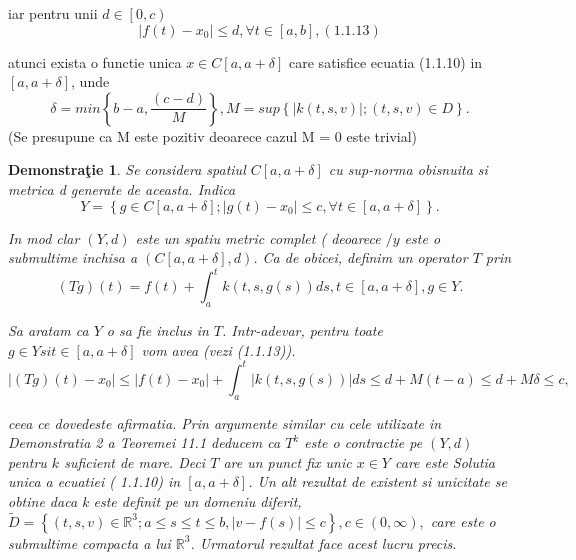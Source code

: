 \documentclass[a4paper,12pt,oneside]{report}
\newtheorem{demonstration}{Demonstra\c tie}
\begin{document}
iar pentru unii \(d \in \left [ 0,c \right )\) 
\begin{displaymath}
  \left | f\left ( t \right ) - x_{0}\right | \leq d, \forall t \in \left [ a,b \right ], (1.1.13)
\end{displaymath}

atunci exista o functie unica \(x\in C \left [ a, a + \delta  \right ]\) care satisfice ecuatia (1.1.10) in  \(\left [ a, a + \delta  \right ]\), unde 
\begin{displaymath}
  \delta  = min \left \{ b-a, \frac{\left ( c-d \right )}{M} \right \}, M = sup \left \{ \left | k\left ( t,s,v \right ) \right |;\left ( t,s,v \right ) \in D \right \}.
\end{displaymath}
(Se presupune ca M este pozitiv deoarece cazul M = 0 este trivial)


\begin{demonstration}
Se considera spatiul \(C \left [ a, a + \delta  \right ]\) cu sup-norma obisnuita si metrica d generate de aceasta.  Indica 
\begin{displaymath}
  Y = \left \{ g\in C \left [ a,a+\delta  \right ] ; \left | g\left ( t \right ) - x_{0}\right | \leq c, \forall t \in \left [ a, a+\delta  \right ]\right \}. 
\end{displaymath}

	In mod clar \(\left ( Y,d \right )\) este un spatiu metric complet ( deoarece \(/y\) este o submultime inchisa a \(\left ( C \left [ a, a + \delta  \right ] , d \right )\). Ca de obicei, definim un operator \(T\) prin
 \begin{displaymath}
  \left ( Tg \right )\left ( t \right ) = f\left ( t \right ) + \int_{a}^{t}k\left ( t,s,g\left ( s \right ) \right )ds, t\in \left [ a, a + \delta  \right ], g\in Y. 
\end{displaymath}

	Sa aratam ca \(Y\) o sa fie inclus in \(T\). Intr-adevar, pentru toate \(g\in Y si t\in \left [ a, a+ \delta  \right ]\) vom avea (vezi (1.1.13)). 
\begin{displaymath}
  \left | \left ( Tg \right )\left ( t \right ) - x_{0}\right | \leq \left | f\left ( t \right )-x_{0} \right | + \int_{a}^{t}\left | k\left ( t,s,g\left ( s \right ) \right ) \right |ds \leq d + M\left ( t-a \right ) \leq  d+ M\delta  \leq  c,
\end{displaymath}
 
ceea ce dovedeste afirmatia. Prin argumente similar cu cele utilizate in Demonstratia 2 a Teoremei 11.1 deducem ca \(T^{k}\) este o contractie pe \(\left ( Y,d \right )\) pentru \(k\) suficient de mare. Deci \(T\) are un punct fix unic \(x \in Y\) care este Solutia unica a ecuatiei ( 1.1.10) in \(\left [ a, a + \delta  \right ]\). 
	Un alt rezultat de existent si unicitate se obtine daca k este definit pe un domeniu diferit, \(\tilde{D} = \left \{ \left ( t,s,v \right ) \in \mathbb{R}^{3}; a\leq s\leq t\leq b, \left | v - f\left ( s \right ) \right | \leq c \right \}, c\in \left ( 0, \infty  \right ), \)
care este o submultime compacta a lui \(\mathbb{R}^{3}\). Urmatorul rezultat face acest lucru precis. 
	
\end{demonstration}
\end{document}
